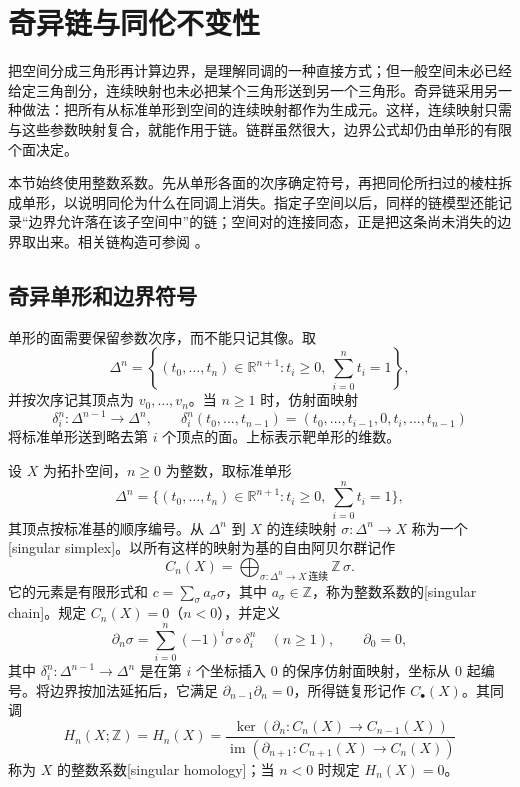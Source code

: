 
% 
% 

\section{奇异链与同伦不变性}
\label{g2:sec:0202}

把空间分成三角形再计算边界，是理解同调的一种直接方式；但一般空间未必已经给定三角剖分，连续映射也未必把某个三角形送到另一个三角形。奇异链采用另一种做法：把所有从标准单形到空间的连续映射都作为生成元。这样，连续映射只需与这些参数映射复合，就能作用于链。链群虽然很大，边界公式却仍由单形的有限个面决定。

本节始终使用整数系数。先从单形各面的次序确定符号，再把同伦所扫过的棱柱拆成单形，以说明同伦为什么在同调上消失。指定子空间以后，同样的链模型还能记录“边界允许落在该子空间中”的链；空间对的连接同态，正是把这条尚未消失的边界取出来。相关链构造可参阅 \cite[第2章，§2.1]{Hatcher2002}。

\subsection{奇异单形和边界符号}
\label{g2:subsec:0202:01}
单形的面需要保留参数次序，而不能只记其像。取
\[
	\Delta^n=\left\{(t_0,\ldots,t_n)\in\mathbb R^{n+1}:
	t_i\ge0,\ \sum_{i=0}^nt_i=1\right\},
\]
并按次序记其顶点为 \(v_0,\ldots,v_n\)。当 \(n\ge1\) 时，仿射面映射
\[
	\delta_i^n:\Delta^{n-1}\longrightarrow\Delta^n,\qquad
	\delta_i^n(t_0,\ldots,t_{n-1})
	=(t_0,\ldots,t_{i-1},0,t_i,\ldots,t_{n-1})
\]
将标准单形送到略去第 \(i\) 个顶点的面。上标表示靶单形的维数。

\begin{definition}[奇异链与奇异同调]\label{g2:def:singular-chain}
	设 \(X\) 为拓扑空间，\(n\ge0\) 为整数，取标准单形
	\[
		\Delta^n=\{(t_0,\ldots,t_n)\in\mathbb R^{n+1}:
		t_i\ge0,\ \textstyle\sum_{i=0}^nt_i=1\},
	\]
	其顶点按标准基的顺序编号。从 \(\Delta^n\) 到 \(X\) 的连续映射 \(\sigma:\Delta^n\to X\) 称为一个[singular simplex]。以所有这样的映射为基的自由阿贝尔群记作
	\[
		C_n(X)=\bigoplus_{\sigma:\Delta^n\to X\ \text{连续}}\mathbb Z\,\sigma.
	\]
	它的元素是有限形式和 \(c=\sum_\sigma a_\sigma\sigma\)，其中 \(a_\sigma\in\mathbb Z\)，称为整数系数的[singular chain]。规定 \(C_n(X)=0\)（\(n<0\)），并定义
	\[
		\partial_n\sigma=\sum_{i=0}^n(-1)^i\sigma\circ\delta_i^n
		\quad(n\ge1),\qquad \partial_0=0,
	\]
	其中 \(\delta_i^n:\Delta^{n-1}\to\Delta^n\) 是在第 \(i\) 个坐标插入 \(0\) 的保序仿射面映射，坐标从 \(0\) 起编号。将边界按加法延拓后，它满足 \(\partial_{n-1}\partial_n=0\)，所得链复形记作 \(C_\bullet(X)\)。其同调
	\[
		H_n(X;\mathbb Z)=H_n(X)
		=\frac{\ker(\partial_n:C_n(X)\to C_{n-1}(X))}
		{\operatorname{im}(\partial_{n+1}:C_{n+1}(X)\to C_n(X))}
	\]
	称为 \(X\) 的整数系数[singular homology]；当 \(n<0\) 时规定 \(H_n(X)=0\)。
\end{definition}

